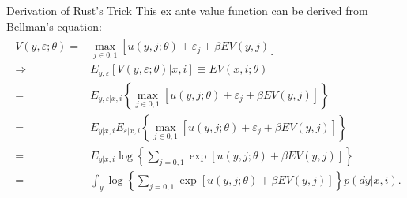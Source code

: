 \documentclass[xcolor=pdftex,dvipsnames,table,mathserif,aspectratio=169]{beamer}
\begin{document}
\begin{frame}{Derivation of Rust's Trick}
\footnotesize
This \alert{ex ante value function} can be derived from Bellman's equation:
\begin{align*}
\begin{split}
V(y, \varepsilon ;\theta) = & \max_{j \in 0,1} [ u(y, j ; \theta) + \varepsilon_j + \beta EV(y,j)] \\
\Longrightarrow & E_{y, \varepsilon} [V(y, \varepsilon ; \theta) | x, i ] \equiv  EV(x, i ; \theta) \\
= & E_{y, \varepsilon | x, i } \left \{ \max_{ j \in 0,1} [ u(y, j ; \theta) + \varepsilon_j + \beta EV(y,j)] \right \} \\
= &  E_{y | x, i }  E_{\varepsilon | x, i } \left \{ \max_{ j \in 0,1} [ u(y, j ; \theta) + \varepsilon_j + \beta EV(y,j)] \right \} \\
= &  E_{y | x, i } \log \left \{ \sum_{j=0,1} \exp [ u(y, j ; \theta)  + \beta EV(y,j)] \right \} \\
= & \int_y \log  \left \{ \sum_{j=0,1} \exp [ u(y, j ; \theta)  + \beta EV(y,j)] \right \} p(dy|x,i).
\end{split}
\end{align*}
\end{frame}
%
\end{document}
